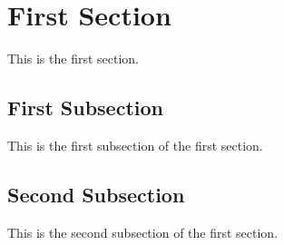 \section{First Section}\label{sec:first}
This is the first section.

\subsection{First Subsection}\label{sub:first}
This is the first subsection of the first section.

\subsection{Second Subsection}\label{sub:second}
This is the second subsection of the first section.